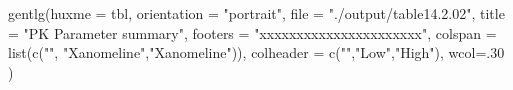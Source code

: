 \documentclass[
  letterpaper,
  DIV=11,
  numbers=noendperiod]{scrreprt}
\newenvironment{Shaded}{\begin{snugshade}}{\end{snugshade}}
\newcommand{\AttributeTok}[1]{\textcolor[rgb]{0.40,0.45,0.13}{#1}}
\newcommand{\DecValTok}[1]{\textcolor[rgb]{0.68,0.00,0.00}{#1}}
\newcommand{\FunctionTok}[1]{\textcolor[rgb]{0.28,0.35,0.67}{#1}}
\newcommand{\NormalTok}[1]{\textcolor[rgb]{0.00,0.23,0.31}{#1}}
\newcommand{\StringTok}[1]{\textcolor[rgb]{0.13,0.47,0.30}{#1}}
\begin{document}
\begin{Shaded}
\begin{Highlighting}[]
\FunctionTok{gentlg}\NormalTok{(}\AttributeTok{huxme =}\NormalTok{ tbl,}
       \AttributeTok{orientation =} \StringTok{"portrait"}\NormalTok{,}
       \AttributeTok{file =} \StringTok{"./output/table14.2.02"}\NormalTok{,}
       \AttributeTok{title =} \StringTok{"PK Parameter summary"}\NormalTok{,}
       \AttributeTok{footers =} \StringTok{"xxxxxxxxxxxxxxxxxxxxxx"}\NormalTok{,}
       \AttributeTok{colspan =} \FunctionTok{list}\NormalTok{(}\FunctionTok{c}\NormalTok{(}\StringTok{""}\NormalTok{, }\StringTok{"Xanomeline"}\NormalTok{,}\StringTok{"Xanomeline"}\NormalTok{)),}
       \AttributeTok{colheader =} \FunctionTok{c}\NormalTok{(}\StringTok{""}\NormalTok{,}\StringTok{"Low"}\NormalTok{,}\StringTok{"High"}\NormalTok{),}
       \AttributeTok{wcol=}\NormalTok{.}\DecValTok{30}
\NormalTok{)}
\end{Highlighting}
\end{Shaded}
\end{document}
